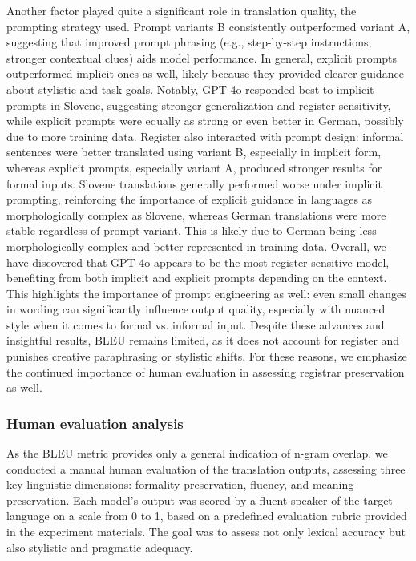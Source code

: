 \documentclass[fleqn,moreauthors,10pt]{ds_report}
\begin{document}
Another factor played quite a significant role in translation quality, the prompting strategy used. Prompt variants B consistently outperformed variant A, suggesting that improved prompt phrasing (e.g., step-by-step instructions, stronger contextual clues) aids model performance. In general, explicit prompts outperformed implicit ones as well, likely because they provided clearer guidance about stylistic and task goals. Notably, GPT-4o responded best to implicit prompts in Slovene, suggesting stronger generalization and register sensitivity, while explicit prompts were equally as strong or even better in German, possibly due to more training data.
Register also interacted with prompt design: informal sentences were better translated using variant B, especially in implicit form, whereas explicit prompts, especially variant A, produced stronger results for formal inputs. Slovene translations generally performed worse under implicit prompting, reinforcing the importance of explicit guidance in languages as morphologically complex as Slovene, whereas German translations were more stable regardless of prompt variant. This is likely due to German being less morphologically complex and better represented in training data.
Overall, we have discovered that GPT-4o appears to be the most register-sensitive model, benefiting from both implicit and explicit prompts depending on the context. This highlights the importance of prompt engineering as well: even small changes in wording can significantly influence output quality, especially with nuanced style when it comes to formal vs. informal input.
Despite these advances and insightful results, BLEU remains limited, as it does not account for register and punishes creative paraphrasing or stylistic shifts. For these reasons, we emphasize the continued importance of human evaluation in assessing registrar preservation as well.

\subsubsection{Human evaluation analysis}

As the BLEU metric provides only a general indication of n-gram overlap, we conducted a manual human evaluation of the translation outputs, assessing three key linguistic dimensions: formality preservation, fluency, and meaning preservation. Each model’s output was scored by a fluent speaker of the target language on a scale from 0 to 1, based on a predefined evaluation rubric provided in the experiment materials. The goal was to assess not only lexical accuracy but also stylistic and pragmatic adequacy.
\end{document}
